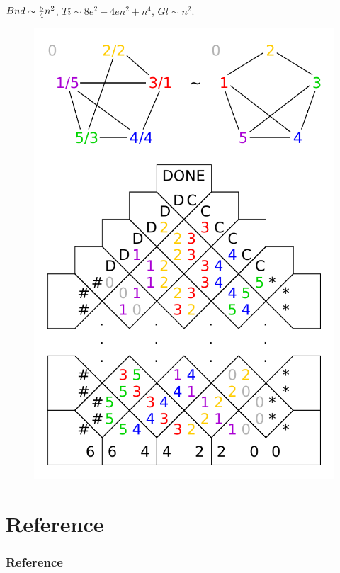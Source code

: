 \documentclass[10pt]{beamer}
\theoremstyle{definition}
\theoremstyle{remark}
\begin{document}
\begin{frame}[plain]
	~\\$Bnd \sim \nicefrac{5}{4}n^2$, $Ti \sim 8e^2 - 4en^2 + n^4$, $Gl \sim n^2$.
	\begin{figure}[h]
	\begin{center}
		\includegraphics[scale=0.52]{../figures/isomorphism/isomorphism.pdf}
	\end{center}
	\end{figure}
\end{frame}

\section*{Reference}
\begin{frame}
\frametitle{Reference}
	{}
	
\end{frame}
\end{document}
